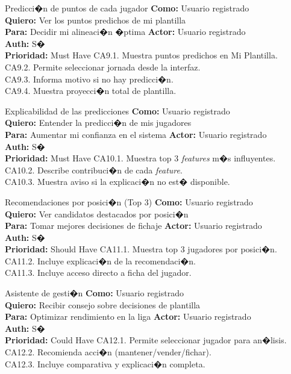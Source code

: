 {Predicci�n de puntos de cada jugador}
{\textbf{Como:} Usuario registrado\\ \textbf{Quiero:} Ver los puntos predichos de mi plantilla\\ \textbf{Para:} Decidir mi alineaci�n �ptima}
{\textbf{Actor:} Usuario registrado\\ \textbf{Auth:} S�\\ \textbf{Prioridad:} Must Have}
{CA9.1. Muestra puntos predichos en Mi Plantilla.\\ CA9.2. Permite seleccionar jornada desde la interfaz.\\ CA9.3. Informa motivo si no hay predicci�n.\\ CA9.4. Muestra proyecci�n total de plantilla.}

{Explicabilidad de las predicciones}
{\textbf{Como:} Usuario registrado\\ \textbf{Quiero:} Entender la predicci�n de mis jugadores\\ \textbf{Para:} Aumentar mi confianza en el sistema}
{\textbf{Actor:} Usuario registrado\\ \textbf{Auth:} S�\\ \textbf{Prioridad:} Must Have}
{CA10.1. Muestra top 3 \textit{features} m�s influyentes.\\ CA10.2. Describe contribuci�n de cada \textit{feature}.\\ CA10.3. Muestra aviso si la explicaci�n no est� disponible.}

{Recomendaciones por posici�n (Top 3)}
{\textbf{Como:} Usuario registrado\\ \textbf{Quiero:} Ver candidatos destacados por posici�n\\ \textbf{Para:} Tomar mejores decisiones de fichaje}
{\textbf{Actor:} Usuario registrado\\ \textbf{Auth:} S�\\ \textbf{Prioridad:} Should Have}
{CA11.1. Muestra top 3 jugadores por posici�n.\\ CA11.2. Incluye explicaci�n de la recomendaci�n.\\ CA11.3. Incluye acceso directo a ficha del jugador.}

{Asistente de gesti�n}
{\textbf{Como:} Usuario registrado\\ \textbf{Quiero:} Recibir consejo sobre decisiones de plantilla\\ \textbf{Para:} Optimizar rendimiento en la liga}
{\textbf{Actor:} Usuario registrado\\ \textbf{Auth:} S�\\ \textbf{Prioridad:} Could Have}
{CA12.1. Permite seleccionar jugador para an�lisis.\\ CA12.2. Recomienda acci�n (mantener/vender/fichar).\\ CA12.3. Incluye comparativa y explicaci�n completa.}

